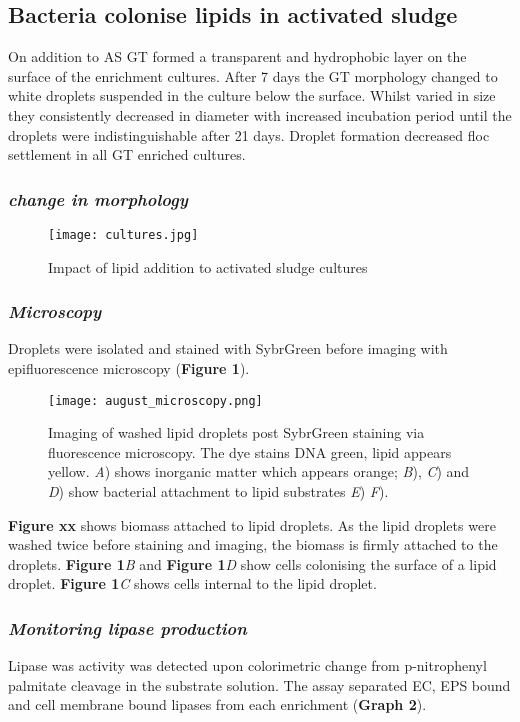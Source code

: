 \documentclass[11pt]{article}
\begin{document}
\subsection{Bacteria colonise lipids in activated sludge}
On addition to AS GT formed a transparent and hydrophobic layer on the surface of the enrichment cultures. After 7 days the GT morphology changed to white droplets suspended in the culture below the surface. Whilst varied in size they consistently decreased in diameter with increased incubation period until the droplets were indistinguishable after 21 days. Droplet formation decreased floc settlement in all GT enriched cultures.

\subsubsection{\emph{change in morphology}}
\begin{figure}
\texttt{[image: cultures.jpg]}
\caption{Impact of lipid addition to activated sludge cultures}
\end{figure}


\subsubsection{\emph{Microscopy}}
 Droplets were isolated and stained with SybrGreen before imaging with epifluorescence microscopy (\textbf{Figure 1}). 

\begin{figure}
\texttt{[image: august\_microscopy.png]}
\caption{Imaging of washed lipid droplets post SybrGreen staining via fluorescence microscopy. The dye stains DNA green, lipid appears yellow. \textit{A}) shows inorganic matter which appears orange; \textit{B}), \textit{C}) and \textit{D}) show bacterial attachment to lipid substrates \textit{E}) \textit{F}).}
\end{figure}


\textbf{Figure xx } shows biomass attached to lipid droplets. As the lipid droplets were washed twice before staining and imaging, the biomass is firmly attached to the droplets. \textbf{Figure 1}\textit{B} and \textbf{Figure 1}\textit{D} show cells colonising the surface of a lipid droplet. \textbf{Figure 1}\textit{C} shows cells internal to the lipid droplet.

\subsubsection{\emph{Monitoring lipase production}}
Lipase was activity was detected upon colorimetric change from p-nitrophenyl palmitate cleavage in the substrate solution. The assay separated  EC, EPS bound and cell membrane bound lipases from each enrichment (\textbf{Graph 2}).
\end{document}
